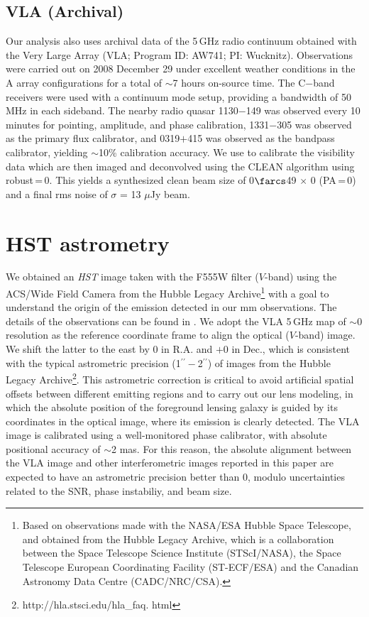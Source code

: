 \documentclass[]{emulateapj}
\begin{document}
\subsection{VLA (Archival)} %
Our analysis also uses archival data of the 5\,GHz
radio continuum obtained with the
Very Large Array (VLA; Program ID: AW741; PI: Wucknitz).
Observations were carried out on 2008 December 29 under excellent weather
conditions in the A array configurations for a total of $\sim$7 hours on-source time. The C$-$band receivers were used with a continuum mode setup,
providing a bandwidth of 50 MHz in each sideband.
The nearby radio quasar 1130$-$149 was observed every 10 minutes for
pointing, amplitude, and phase calibration, 1331$-$305 was observed as the
primary flux calibrator, and 0319$+$415 was observed as the bandpass
calibrator, yielding $\sim$10\% calibration accuracy.
We use  to calibrate the visibility data which
are then imaged and deconvolved using
the CLEAN algorithm using robust\,=\,0. This yields a synthesized clean
beam size of 0$\farcs$49 $\times$ 0 (PA\,=\,0) and a final
rms noise of $\sigma$ = 13 $\mu$Jy beam\pmOne.


\section{HST astrometry} \label{sec:HST}
We obtained an {\it HST} image taken with the F555W filter ($V$-band)
using the ACS/Wide Field Camera from the
Hubble Legacy Archive\footnote{Based on observations
made with the NASA/ESA Hubble Space Telescope, and obtained from the Hubble
Legacy Archive, which is a collaboration between the Space Telescope Science
Institute (STScI/NASA), the Space Telescope European Coordinating Facility
(ST-ECF/ESA) and the Canadian Astronomy Data Centre (CADC/NRC/CSA).}
with a goal to understand the origin of the emission detected
in our mm observations. The details of the observations can be found
in \citet[hereafter C06]{Claeskens06a}.
We adopt the VLA 5\,GHz map of
$\sim$0 resolution as the
reference coordinate frame to align the optical ($V$-band) image.
We shift the latter to the east by 0 in R.A. and $+$0 in
Dec., which is consistent with the typical astrometric precision (1$^{\prime\prime}-$2$^{\prime\prime}$) of
images from the Hubble Legacy Archive\footnote{http://hla.stsci.edu/hla\_faq.
html}. This astrometric correction is critical to avoid artificial spatial
offsets between different emitting regions and to carry out our lens modeling,
in which the absolute position of the foreground lensing galaxy is guided by its
coordinates in the optical image, where its emission is clearly detected.
The VLA image is calibrated using a well-monitored phase
calibrator, with absolute positional accuracy of $\sim$2 mas.
For this reason, the absolute alignment between the VLA image and other
interferometric images reported in this paper are expected to have an astrometric
precision better than 0, modulo uncertainties related to the SNR, phase
instabiliy, and beam size.
\end{document}
